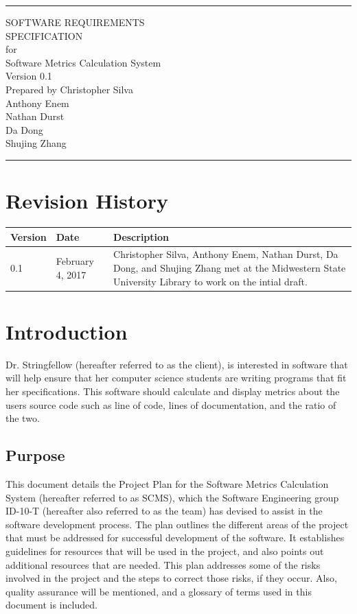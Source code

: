 \documentclass{scrreprt}
\author{Christopher Silva}
\date{}
\def\myversion{0.1 }
\begin{document}
	\begin{titlepage}
		\flushright
		\rule{16cm}{5pt}\vskip1cm
		\Huge{SOFTWARE REQUIREMENTS\\ SPECIFICATION}\\
		\vspace{2cm}
		for\\
		\vspace{2cm}
		Software Metrics Calculation System\\
		\vspace{2cm}
		\LARGE{Version \myversion\\}
		\vspace{2cm}
		Prepared by Christopher Silva\\
		Anthony Enem\\
		Nathan Durst\\
		Da Dong\\
		Shujing Zhang\\
		\vfill
		\rule{16cm}{5pt}
	\end{titlepage}
	\tableofcontents
	\chapter*{Revision History}
	\begin{tabular}{|p{1.5cm}|p{3cm}|p{9.5cm}|}
		\hline 
		Version & Date & Description \\ 
		\hline 
		0.1 & February 4, 2017 & Christopher Silva, Anthony Enem, Nathan Durst, Da Dong, and Shujing Zhang met at the Midwestern State University Library to work on the intial draft. \\ 
		\hline 
	\end{tabular} 
	\chapter{Introduction}
	Dr. Stringfellow (hereafter referred to as the client), is interested in software that will help ensure that her computer science students are writing programs that fit her specifications. This software should calculate and display metrics about the users source code such as line of code, lines of documentation, and the ratio of the two.
	\section{Purpose}
	This document details the Project Plan for the Software Metrics Calculation System (hereafter referred to as SCMS), which the Software Engineering group ID-10-T (hereafter also referred to as the team) has devised to assist in the software development process. The plan outlines the different areas of the project that must be addressed for successful development of the software. It establishes guidelines for resources that will be used in the project, and also points out additional resources that are needed. This plan addresses some of the risks involved in the project and the steps to correct those risks, if they occur. Also, quality assurance will be mentioned, and a glossary of terms used in this document is included.
\end{document}
